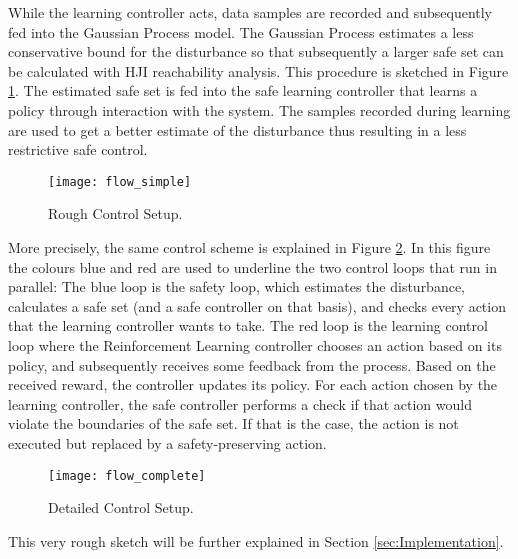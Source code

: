 \documentclass[../main.tex]{subfiles}
\begin{document}
While the learning controller acts, data samples are recorded and subsequently fed into the Gaussian Process model. The Gaussian Process estimates a less conservative bound for the disturbance so that subsequently a larger safe set can be calculated with HJI reachability analysis. This procedure is sketched in Figure \ref{fig:flow_simple}. The estimated safe set is fed into the safe learning controller that learns a policy through interaction with the system. The samples recorded during learning are used to get a better estimate of the disturbance thus resulting in a less restrictive safe control.\par
\begin{figure}
    \centering
    \texttt{[image: flow\_simple]}
    \caption{Rough Control Setup.}
    \label{fig:flow_simple}
\end{figure}
More precisely, the same control scheme is explained in Figure \ref{fig:flow_complete}. In this figure the colours blue and red are used to underline the two control loops that run in parallel: The blue loop is the safety loop, which estimates the disturbance, calculates a safe set (and a safe controller on that basis), and checks every action that the learning controller wants to take. The red loop is the learning control loop where the Reinforcement Learning controller chooses an action based on its policy, and subsequently receives some feedback from the process. Based on the received reward, the controller updates its policy. For each action chosen by the learning controller, the safe controller performs a check if that action would violate the boundaries of the safe set. If that is the case, the action is not executed but replaced by a safety-preserving action.
\begin{figure}
    \centering
    \texttt{[image: flow\_complete]}
    \caption{Detailed Control Setup.}
    \label{fig:flow_complete}
\end{figure}
This very rough sketch will be further explained in Section \ref{sec:Implementation}.
\end{document}
